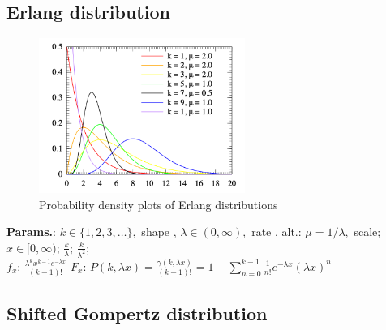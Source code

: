     
        
\subsection{Erlang distribution}


    \begin{figure}[H]
        \centering
        \includegraphics[width=0.6\textwidth]{images/Erlang_dist_pdf.png}
        \caption{Probability density plots of Erlang distributions}
    \end{figure}




    {\color{darkblue} \textbf{Params.}:} {$ k \in \{1,2,3,\ldots\},$ shape ,  $ \lambda \in (0,\infty),$ rate , alt.: $ \mu = 1/\lambda,$ scale}; {$ x \in [0, \infty)$}; {$ \frac{k}{\lambda}$}; {$ \frac{k}{\lambda^2}$};\hspace{0.5cm}\\{\color{darkblue} \textbf{$f_x$}:} {$ \frac{\lambda^k x^{k-1} e^{-\lambda x}}{(k-1)!}$}{\color{darkblue} \textbf{$F_x$}:} {$ P(k, \lambda x) = \frac{\gamma(k, \lambda x)}{(k - 1)!} = 1 - \sum_{n=0}^{k-1}\frac{1}{n!}e^{-\lambda x}(\lambda x)^{n}$}



    
        
\subsection{Shifted Gompertz distribution}



